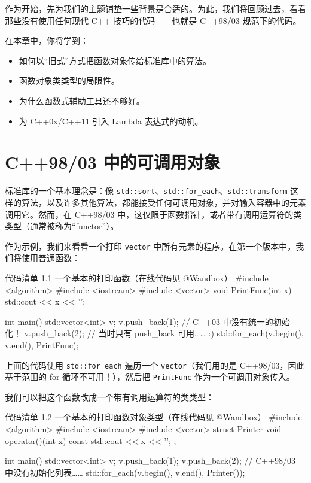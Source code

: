 作为开始，先为我们的主题铺垫一些背景是合适的。为此，我们将回顾过去，看看那些没有使用任何现代 C++ 技巧的代码——也就是 C++98/03 规范下的代码。

在本章中，你将学到：

\begin{itemize}
\item 如何以“旧式”方式把函数对象传给标准库中的算法。
\item 函数对象类类型的局限性。
\item 为什么函数式辅助工具还不够好。
\item 为 C++0x/C++11 引入 Lambda 表达式的动机。
\end{itemize}

\section{C++98/03 中的可调用对象}

标准库的一个基本理念是：像 \texttt{std::sort}、\texttt{std::for\_each}、\texttt{std::transform} 这样的算法，以及许多其他算法，都能接受任何可调用对象，并对输入容器中的元素调用它。然而，在 C++98/03 中，这仅限于函数指针，或者带有调用运算符的类类型（通常被称为“functor”）。

作为示例，我们来看看一个打印 \texttt{vector} 中所有元素的程序。在第一个版本中，我们将使用普通函数：

\begin{codeboxt}{代码清单 1.1 一个基本的打印函数（在线代码见 @Wandbox）}
#include <algorithm>
#include <iostream>
#include <vector>
void PrintFunc(int x) {
std::cout << x << '\n';
}

int main() {
std::vector<int> v;
v.push_back(1); // C++03 中没有统一的初始化！
v.push_back(2); // 当时只有 push_back 可用…… :)
std::for_each(v.begin(), v.end(), PrintFunc);
}
\end{codeboxt}

上面的代码使用 \texttt{std::for\_each} 遍历一个 \texttt{vector}（我们用的是 C++98/03，因此基于范围的 for 循环不可用！），然后把 \texttt{PrintFunc} 作为一个可调用对象传入。

我们可以把这个函数改成一个带有调用运算符的类类型：

\begin{codeboxt}{代码清单 1.2 一个基本的打印函数对象类型（在线代码见 @Wandbox）}
#include <algorithm>
#include <iostream>
#include <vector>
struct Printer {
void operator()(int x) const {
std::cout << x << '\n';
}
};

int main() {
std::vector<int> v;
v.push_back(1);
v.push_back(2); // C++98/03 中没有初始化列表……
std::for_each(v.begin(), v.end(), Printer());
}
\end{codeboxt}

